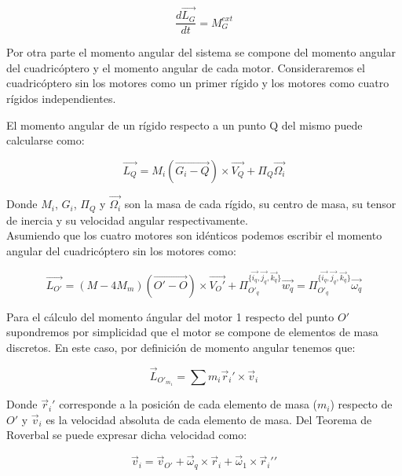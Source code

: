 \documentclass[main]{subfiles}
\begin{document}
\begin{equation}
\frac{d\vec{L_G}}{dt} =M_G^{ext}
\end{equation}



Por otra parte el momento angular del sistema se compone del momento angular del cuadric\'optero y el momento angular de cada motor. Consideraremos el cuadric\'optero sin los motores como un primer r\'igido y los motores como cuatro r\'igidos independientes.

El momento angular de un r\'igido respecto a un punto Q del mismo puede calcularse como:

\begin{equation}
\vec{L_Q} = M_i(\vec{G_i-Q})\times\vec{V_Q}+\Pi_{Q}\vec{\Omega_i}
\end{equation}

Donde $M_i$, $G_i$, $\Pi_{Q}$ y $\vec{\Omega_i}$ son la masa de cada r\'igido, su centro de masa, su tensor de inercia y su velocidad angular respectivamente.\\

Asumiendo que los cuatro motores son id\'enticos podemos escribir el momento angular del cuadric\'optero sin los motores como:

\begin{equation}
\vec{L_{O\prime}} = (M-4 M_m)(\vec{O\prime-O})\times\vec{V_O\prime}+\Pi_{O\prime_q}^{\{\vec{i_q}, \vec{j_q}, \vec{k_q}\}}\vec{w_q}=\Pi_{O\prime_q}^{\{\vec{i_q}, \vec{j_q}, \vec{k_q}\}}\vec{\omega_q}
\end{equation}

Para el c\'alculo del momento \'angular del motor 1 respecto del punto $O\prime$ supondremos por simplicidad que el motor se compone de elementos de masa discretos. En este caso, por definici\'on de momento angular tenemos que:

\begin{equation}
\vec{L}_{O\prime_{m_1}} = \sum m_i\vec{r}_i\prime \times \vec{v}_i
\end{equation}

Donde $\vec{r}_i\prime$ corresponde a la posici\'on de cada elemento de masa ($m_i$) respecto de $O\prime$ y $\vec{v}_i$ es la velocidad absoluta de cada elemento de masa. Del Teorema de Roverbal se puede expresar dicha velocidad como:

\begin{equation}
\vec{v}_i = \vec{v}_{O\prime} + \vec{\omega}_q \times \vec{r}_i + \vec{\omega}_1 \times \vec{r}_i\prime\prime
\end{equation}
\end{document}
